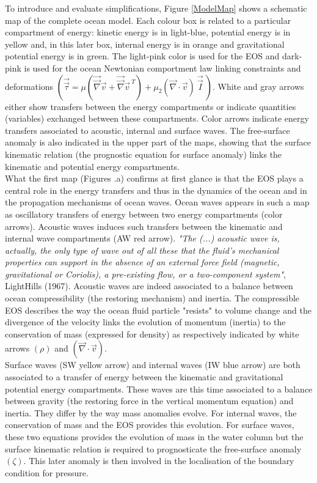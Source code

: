 \documentclass[a4paper,11pt]{article}
\begin{document}
To introduce and evaluate simplifications, Figure \ref{ModelMap} shows a schematic map of the complete ocean model. Each colour box is related to a particular compartment of energy: kinetic energy is in light-blue, potential energy is in yellow and, in this later box, internal energy is in orange and gravitational potential energy is in green. The light-pink color is used for the EOS and dark-pink is used for the ocean Newtonian comportment law linking constraints and deformations 
$\left(\vec{\vec{\tau}}=\mu(\vec{\vec{\nabla}}\vec{v}+\vec{\vec{\nabla}}\vec{v}^{\ T})
 +\mu_2(\vec{\nabla}\cdot\vec{v})\ \vec{\vec{I}}\ \right) $. 
White and gray arrows either show transfers between the energy compartments or indicate quantities (variables) exchanged between these compartments. Color arrows indicate energy transfers associated to acoustic, internal and surface waves.
The free-surface anomaly is also indicated in the upper part of the maps, showing that the surface kinematic relation (the prognostic equation for surface anomaly) links the kinematic and potential energy compartments.\\
What the first map (Figures .a) confirms at first glance is that the EOS plays a central role in the energy transfers and thus in the dynamics of the ocean and in the propagation mechanisms of ocean waves. 
Ocean waves appears in such a map as oscillatory transfers of energy between two energy compartments (color arrows). 
Acoustic waves induces such transfers between the kinematic and internal wave compartments (AW red arrow). \textit{"The (...) acoustic wave is, actually, the only type of wave out of all these that the fluid's mechanical properties can support in the absence of an external force field (magnetic, gravitational or Coriolis), a pre-existing flow, or a two-component system"}, LightHills (1967). Acoustic waves are indeed associated to a balance between ocean compressibility (the restoring mechanism) and inertia. The compressible EOS describes the way the ocean fluid particle "resists" to volume change and the divergence of the velocity links the evolution of momentum (inertia) to the conservation of mass (expressed for density) as respectively indicated by white arrows $(\rho)$ and $(\vec{\nabla}\cdot\vec{v})$.\\
Surface waves (SW yellow arrow) and internal waves (IW blue arrow) are both associated to a transfer of energy between the kinematic and gravitational potential energy compartments. These waves are this time associated to a balance between gravity (the restoring force in the vertical momentum equation) and inertia. They differ by the way mass anomalies evolve. For internal waves, the conservation of mass and the EOS provides this evolution. For surface waves, these two equations provides the evolution of mass in the water column but the surface kinematic relation is required to prognosticate the free-surface anomaly $(\zeta)$. This later anomaly is then involved in the localisation of the boundary condition for pressure.\\
\end{document}
